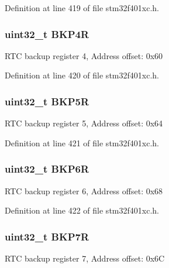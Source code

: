 Definition at line 419 of file stm32f401xc.\+h.

\subsubsection[{\texorpdfstring{B\+K\+P4R}{BKP4R}}]{ uint32\+\_\+t B\+K\+P4R}\hypertarget{struct_r_t_c___type_def_ab13e106cc2eca92d1f4022df3bfdbcd7}{}\label{struct_r_t_c___type_def_ab13e106cc2eca92d1f4022df3bfdbcd7}
R\+TC backup register 4, Address offset\+: 0x60 

Definition at line 420 of file stm32f401xc.\+h.

\subsubsection[{\texorpdfstring{B\+K\+P5R}{BKP5R}}]{ uint32\+\_\+t B\+K\+P5R}\hypertarget{struct_r_t_c___type_def_ab6bed862c0d0476ff4f89f7b9bf3e130}{}\label{struct_r_t_c___type_def_ab6bed862c0d0476ff4f89f7b9bf3e130}
R\+TC backup register 5, Address offset\+: 0x64 

Definition at line 421 of file stm32f401xc.\+h.

\subsubsection[{\texorpdfstring{B\+K\+P6R}{BKP6R}}]{ uint32\+\_\+t B\+K\+P6R}\hypertarget{struct_r_t_c___type_def_a1d854d2d7f0452f4c90035952b92d2ba}{}\label{struct_r_t_c___type_def_a1d854d2d7f0452f4c90035952b92d2ba}
R\+TC backup register 6, Address offset\+: 0x68 

Definition at line 422 of file stm32f401xc.\+h.

\subsubsection[{\texorpdfstring{B\+K\+P7R}{BKP7R}}]{ uint32\+\_\+t B\+K\+P7R}\hypertarget{struct_r_t_c___type_def_a2ca54ce1a8d2fa9d1ba6d5987ed5e2cf}{}\label{struct_r_t_c___type_def_a2ca54ce1a8d2fa9d1ba6d5987ed5e2cf}
R\+TC backup register 7, Address offset\+: 0x6C 

